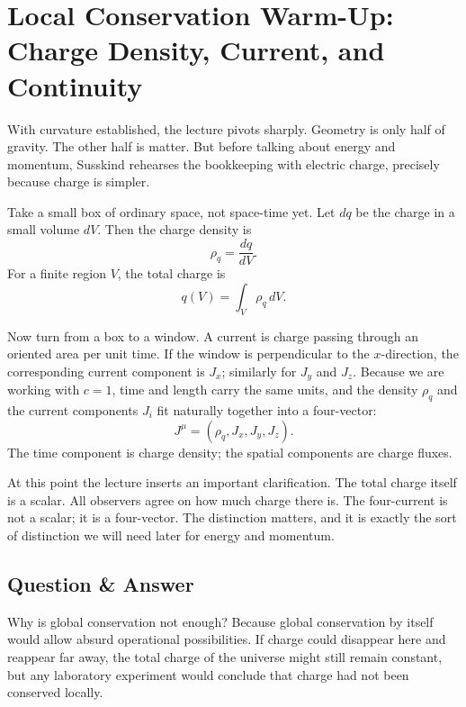 \section{Local Conservation Warm-Up: Charge Density, Current, and Continuity}

With curvature established, the lecture pivots sharply. Geometry is only half of gravity. The other half is matter. But before talking about energy and momentum, Susskind rehearses the bookkeeping with electric charge, precisely because charge is simpler.

Take a small box of ordinary space, not space-time yet. Let \(dq\) be the charge in a small volume \(dV\). Then the charge density is
\begin{equation}
\rho_q=\frac{dq}{dV}.
\end{equation}
For a finite region \(V\), the total charge is
\begin{equation}
q(V)=\int_V \rho_q\,dV.
\end{equation}

Now turn from a box to a window. A current is charge passing through an oriented area per unit time. If the window is perpendicular to the \(x\)-direction, the corresponding current component is \(J_x\); similarly for \(J_y\) and \(J_z\). Because we are working with \(c=1\), time and length carry the same units, and the density \(\rho_q\) and the current components \(J_i\) fit naturally together into a four-vector:
\begin{equation}
J^\mu=(\rho_q,J_x,J_y,J_z).
\end{equation}
The time component is charge density; the spatial components are charge fluxes.

At this point the lecture inserts an important clarification. The total charge itself is a scalar. All observers agree on how much charge there is. The four-current is not a scalar; it is a four-vector. The distinction matters, and it is exactly the sort of distinction we will need later for energy and momentum.

\subsection{Question \& Answer}

Why is global conservation not enough? Because global conservation by itself would allow absurd operational possibilities. If charge could disappear here and reappear far away, the total charge of the universe might still remain constant, but any laboratory experiment would conclude that charge had not been conserved locally.

